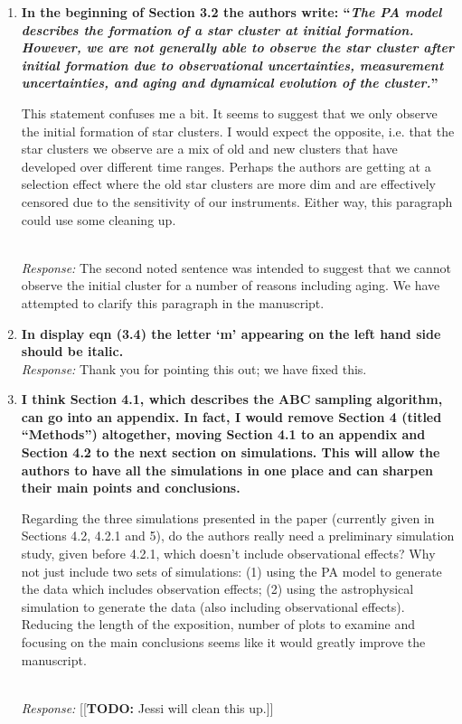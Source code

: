 \documentclass[11pt, oneside]{article}   	%
\newcommand{\todo}[1]{{\color{red}[[\textbf{TODO: }#1]]}}
\begin{document}
\begin{enumerate}
\item {\bf In the beginning of Section 3.2 the authors write: ``\emph{The PA model describes the formation of a star cluster at initial formation. However, we are not generally able to observe the star cluster after initial formation due to observational uncertainties, measurement uncertainties, and aging and dynamical evolution of the cluster.}''

This statement confuses me a bit. It seems to suggest that we only observe the initial formation of star clusters. I would expect the opposite, i.e. that the star clusters we observe are a mix of old and new clusters that have developed over different time ranges. Perhaps the authors are getting at a selection effect where the old star clusters are more dim and are effectively censored due to the sensitivity of our instruments. Either way, this paragraph could use some cleaning up.} \\
\noindent \emph{Response:} The second noted sentence was intended to suggest that we cannot observe the initial cluster for a number of reasons including aging.  We have attempted to clarify this paragraph in the manuscript.
\bigskip

\item {\bf In display eqn (3.4) the letter `m' appearing on the left hand side should be italic.} \\
\noindent \emph{Response:} Thank you for pointing this out; we have fixed this.
\bigskip

\item {\bf I think Section 4.1, which describes the ABC sampling algorithm, can go into an appendix. In fact, I would remove Section 4 (titled ``Methods'') altogether, moving Section 4.1 to an appendix and Section 4.2 to the next section on simulations. This will allow the authors to have all the simulations in one place and can sharpen their main points and conclusions.

Regarding the three simulations presented in the paper (currently given in Sections 4.2, 4.2.1 and 5), do the authors really need a preliminary simulation study, given before 4.2.1, which doesn't include observational effects? Why not just include two sets of simulations: (1) using the PA model to generate the data which includes observation effects; (2) using the astrophysical simulation to generate the data (also including observational effects). Reducing the length of the exposition, number of plots to examine and focusing on the main conclusions seems like it would greatly improve the manuscript.
}\\
\noindent \emph{Response:} \todo{Jessi will clean this up.}
\bigskip
\end{enumerate}
\end{document}
